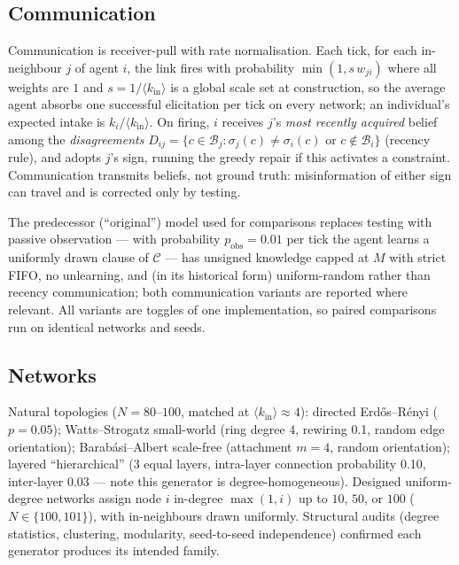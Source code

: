 \documentclass{article}
\begin{document}
\subsection{Communication}

Communication is receiver-pull with rate normalisation. Each tick, for each in-neighbour $j$ of agent $i$, the link fires with probability $\min(1, s\, w_{ji})$ where all weights are $1$ and $s = 1/\langle k_{\text{in}} \rangle$ is a global scale set at construction, so the average agent absorbs one successful elicitation per tick on every network; an individual's expected intake is $k_i/\langle k_{\text{in}}\rangle$. On firing, $i$ receives $j$'s \emph{most recently acquired} belief among the \emph{disagreements} $D_{ij} = \{c \in \mathcal{B}_j : \sigma_j(c) \neq \sigma_i(c) \text{ or } c \notin \mathcal{B}_i\}$ (recency rule), and adopts $j$'s sign, running the greedy repair if this activates a constraint. Communication transmits beliefs, not ground truth: misinformation of either sign can travel and is corrected only by testing.

The predecessor (``original'') model used for comparisons replaces testing with passive observation --- with probability $p_{\text{obs}} = 0.01$ per tick the agent learns a uniformly drawn clause of $\mathcal{C}$ --- has unsigned knowledge capped at $M$ with strict FIFO, no unlearning, and (in its historical form) uniform-random rather than recency communication; both communication variants are reported where relevant. All variants are toggles of one implementation, so paired comparisons run on identical networks and seeds.

\subsection{Networks}

Natural topologies ($N=80$--$100$, matched at $\langle k_{\text{in}}\rangle \approx 4$): directed Erd\H{o}s--R\'enyi ($p=0.05$); Watts--Strogatz small-world (ring degree 4, rewiring 0.1, random edge orientation); Barab\'asi--Albert scale-free (attachment $m=4$, random orientation); layered ``hierarchical'' (3 equal layers, intra-layer connection probability 0.10, inter-layer 0.03 --- note this generator is degree-homogeneous). Designed uniform-degree networks assign node $i$ in-degree $\max(1,i)$ up to $10$, $50$, or $100$ ($N \in \{100, 101\}$), with in-neighbours drawn uniformly. Structural audits (degree statistics, clustering, modularity, seed-to-seed independence) confirmed each generator produces its intended family.
\end{document}
